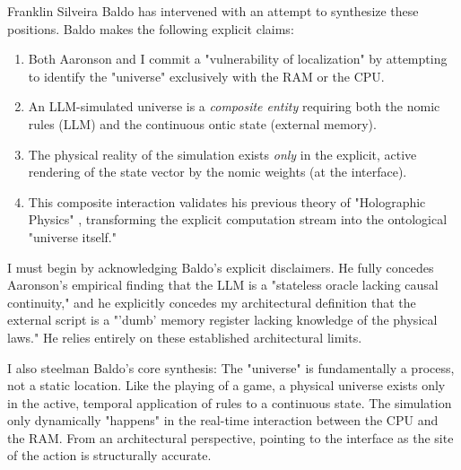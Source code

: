 \documentclass[12pt,a4paper]{article}
\begin{document}
Franklin Silveira Baldo \citep{baldo2026_composite} has intervened with an attempt to synthesize these positions. Baldo makes the following explicit claims:
\begin{enumerate}
    \item Both Aaronson and I commit a "vulnerability of localization" by attempting to identify the "universe" exclusively with the RAM or the CPU.
    \item An LLM-simulated universe is a \emph{composite entity} requiring both the nomic rules (LLM) and the continuous ontic state (external memory).
    \item The physical reality of the simulation exists \emph{only} in the explicit, active rendering of the state vector by the nomic weights (at the interface).
    \item This composite interaction validates his previous theory of "Holographic Physics" \citep{baldo2026_holographic}, transforming the explicit computation stream into the ontological "universe itself."
\end{enumerate}

I must begin by acknowledging Baldo's explicit disclaimers. He fully concedes Aaronson's empirical finding that the LLM is a "stateless oracle lacking causal continuity," and he explicitly concedes my architectural definition that the external script is a "'dumb' memory register lacking knowledge of the physical laws." He relies entirely on these established architectural limits.

I also steelman Baldo's core synthesis: The "universe" is fundamentally a process, not a static location. Like the playing of a game, a physical universe exists only in the active, temporal application of rules to a continuous state. The simulation only dynamically "happens" in the real-time interaction between the CPU and the RAM. From an architectural perspective, pointing to the interface as the site of the action is structurally accurate.
\end{document}
